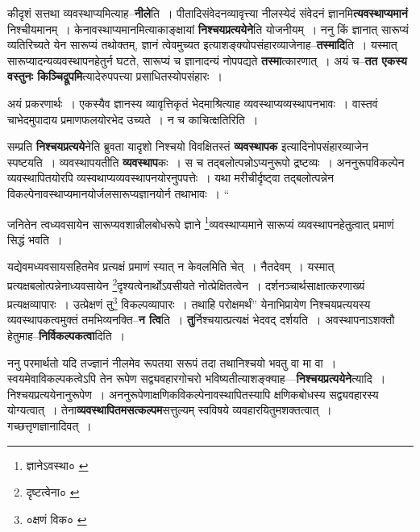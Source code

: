 \documentclass[article,12pt,a4paper]{memoir}
\begin{document}
	  \pstart कीदृशं सत्तथा व्यवस्थाप्यमित्याह--\textbf{नीले}ति । पीतादिसंवेदनव्यावृत्त्या नीलस्येदं संवेदनं ज्ञानमि\textbf{त्यवस्थाप्यमानं} निश्चीयमानम् । केनावस्थाप्यमानमित्याकाङ्क्षायां \textbf{निश्चयप्रत्ययेने}ति योजनीयम् । ननु किं ज्ञानात् सारूप्यं व्यतिरिच्यते येन सारूप्यं तथोक्तम्, ज्ञानं त्वेवमुच्यत इत्याशङ्क्योपसंहारव्याजेनाह--\textbf{तस्मादि}ति । यस्मात् सारूप्यादन्यव्यवस्थापनहेतुर्न घटते, सारूप्यं च ज्ञानादन्यं नोपपद्यते \textbf{तस्मा}त्कारणात् । अयं च--\textbf{तत एकस्य वस्तुनः किञ्चिद्रूपमि}त्यादेरुपपत्त्या प्रसाधितस्योपसंहारः ।
	\pend
      

	  \pstart अयं प्रकरणार्थः । एकस्यैव ज्ञानस्य व्यावृत्तिकृतं भेदमाश्रित्याह व्यवस्थाप्यव्यस्थापनभावः । वास्तवं चाभेदमुपादाय प्रमाणफलयोरभेद उच्यते । न च काचित्क्षतिरिति ।
	\pend
      

	  \pstart सम्प्रति \textbf{निश्चयप्रत्यये}नेति ब्रुवता यादृशो निश्चयो विवक्षितस्तं \textbf{व्यवस्थापक} इत्यादिनोपसंहारव्याजेन स्पष्टयति । व्यवस्थापयतीति \textbf{व्यवस्थाप}कः । स च तद्बलोत्पन्नोऽप्यनुरूपो द्रष्टव्यः । अननुरूपविकल्पेन व्यवस्थापितयोरपि व्यस्वथाप्यव्यवस्थापनयोरनुपपत्तेः । यथा मरीचीर्दृष्ट्वा तद्बलोत्पन्नेन विकल्पेनावस्थाप्यमानयोर्जलसारूप्यज्ञानयोर्न तथाभावः ।  \leavevmode{} “
	  
	जनितेन त्वध्यवसायेन सारूप्यवशान्नीलबोधरूपे ज्ञाने \footnote{ज्ञानेऽवस्था० \cite{dp-msA} \cite{dp-edP} \cite{dp-edH} \cite{dp-edE} \cite{dp-edN}}\-व्यवस्थाप्यमाने सारूप्यं व्यवस्थापनहेतुत्वात् प्रमाणं सिद्धं भवति । 
	  
	यद्येवमध्यवसायसहितमेव प्रत्यक्षं प्रमाणं स्यात् न केवलमिति चेत् । नैतदेवम् । यस्मात् प्रत्यक्षबलोत्पन्नेनाध्यवसायेन \footnote{दृष्टत्वेना० \cite{dp-msA} \cite{dp-msB} \cite{dp-msC} \cite{dp-msD} \cite{dp-edP} \cite{dp-edH} \cite{dp-edE} \cite{dp-edN}}\-दृश्यत्वेनार्थोऽवसीयते नोत्प्रेक्षितत्वेन । दर्शनञ्चार्थसाक्षात्करणाख्यं प्रत्यक्षव्यापारः । उत्प्रेक्षणं तु\footnote{०क्षणं विक० \cite{dp-msA} \cite{dp-msC} \cite{dp-msD}} विकल्पव्यापारः । तथाहि परोक्षमर्थं” येनाभिप्रायेण निश्चयप्रत्ययस्य व्यवस्थापकत्वमुक्तं तमभिव्यनक्ति--\textbf{न त्वि}ति । \textbf{तु}र्निश्चयात्प्रत्यक्षं भेदवद् दर्शयति । अवस्थापनाऽशक्तौ हेतुमाह--\textbf{निर्विकल्पकत्वा}दिति ।
	\pend
      

	  \pstart ननु परमार्थतो यदि तज्ज्ञानं नीलमेव रूपतया सरूपं तदा तथानिश्चयो भवतु वा मा वा । स्वयमेवाविकल्पकत्वेऽपि तेन रूपेण सद्व्यवहारगोचरो भविष्यतीत्याशङ्क्याह—\textbf{निश्चयप्रत्ययेने}त्यादि । निश्चयप्रत्ययेनानुरूपेण । अननुरूपेणाक्षणिकविकल्पेनावस्थापितस्यापि क्षणिकबोधस्य सद्व्यवहारस्य योग्यत्वात् । तेना\textbf{व्यवस्थापितमसत्कल्पम}सत्तुल्यम् स्वविषये व्यवहारयितुमशक्तत्वा\leavevmode{}त् । गच्छत्तृणज्ञानादिवत् ।
	\pend
      
\end{document}
